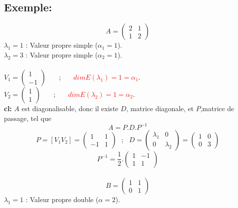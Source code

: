 \documentclass[a4paper,12pt,french]{article}
\begin{document}
\subsection{Exemple:}
\[A=\begin{pmatrix}
	2 & 1  \\
	1 & 2 
	
\end{pmatrix}\]
$\lambda_{1}=1$ : Valeur propre simple ($\alpha_{1}=1$).\\
$\lambda_{2}=3$ : Valeur propre simple ($\alpha_{2}=1$).\\\\
$V_{1}=\begin{pmatrix}
	1  \\
	-1  
	
\end{pmatrix}$ ~~~;~~~ \textcolor{red}{$dim E(\lambda_{1})=1=\alpha_{1}$}.\\
$V_{2}=\begin{pmatrix}
	1  \\
	1  
	
\end{pmatrix}$ ~~~;~~~ \textcolor{red}{$dim E(\lambda_{2})=1=\alpha_{2}$}.\\
\textbf{cl:} $A$ est diagonalisable, donc il existe $D$, matrice diagonale, et $P$,matrice de passage, tel que 
\[A=P.D.P^{-1}\]
\[P=[V_{1} V_{2}]=\begin{pmatrix}
	1 & 1  \\
	-1 & 1 
	
\end{pmatrix} ~~~;~~~ D=\begin{pmatrix}
	\lambda_{1} & 0  \\
	0 & \lambda_{2} 
	
\end{pmatrix}=\begin{pmatrix}
1 & 0  \\
0 & 3 

\end{pmatrix}\]
\[P^{-1}=\frac{1}{2}.\begin{pmatrix}
	1 & -1  \\
	1 & 1
\end{pmatrix} \]\\
\[B=\begin{pmatrix}
	1 & 1  \\
	0 & 1 
	
\end{pmatrix}\]
$\lambda_{1}=1$ : Valeur propre double ($\alpha=2$).\\
\end{document}
